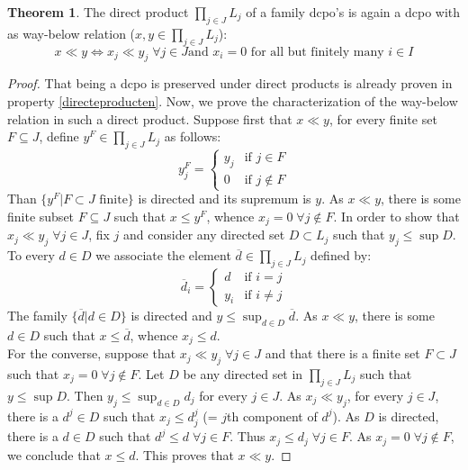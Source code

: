 \documentclass[a4paper,12pt]{article}
\theoremstyle{definition}
\newtheorem{theorem}{Theorem}[section]
\begin{document}
\begin{theorem}
The direct product $\prod_{j \in J}L_j$ of a family dcpo's is again a dcpo with as way-below relation ($x, y \in \prod_{j \in J}L_j$):
$$x \ll y \Leftrightarrow x_j \ll y_j \;\forall j \in J \text{and } x_i = 0 \text{ for all but finitely many } i \in I$$
\end{theorem}

\begin{proof}
That being a dcpo is preserved under direct products is already proven in property \ref{directeproducten}. Now, we prove the characterization of the way-below relation in such a direct product.  Suppose first that $x \ll y$, for every finite set $F \subseteq J$, define $y^F \in \prod_{j \in J}L_j$ as follows:
\begin{equation*}
  y_j^F=\begin{cases}
    y_j & \text{if $j \in F $}\\
    0 & \text{if $j \not\in F $}
  \end{cases}
\end{equation*}
Than $\{y^F | F \subset J \text{ finite}\}$ is directed and its supremum is $y$. As $x \ll y$, there is some finite subset $F \subseteq J$ such that $x \leq y^F$, whence $x_j = 0 \;\forall j \not\in F$.
In order to show that $x_j \ll y_j \;\forall j \in J$, fix $j$ and consider any directed set $D \subset L_j$ such that $y_j \leq \sup D$. To every $d \in D$ we associate the element $\overline{d} \in \prod_{j \in J}L_j$ defined by:
\begin{equation*}
  \overline{d}_i=\begin{cases}
    d & \text{if $i = j$}\\
    y_i & \text{if $i \neq j $}
  \end{cases}
\end{equation*}
The family $\{\overline{d}|d\in D\}$ is directed and $y \leq \sup_{d \in D}\overline{d}$. As $x \ll y$, there is some $d \in D$ such that $x \leq \overline{d}$, whence $x_j \leq d$.\\

For the converse, suppose that $x_j \ll y_j \;\forall j \in J$ and that there is a finite set $F \subset J$ such that $x_j = 0 \;\forall j \not\in F$. Let $D$ be any directed set in $\prod_{j \in J}L_j$ such that $y \leq \sup D$. Then $y_j \leq \sup_{d\in D}d_j$ for every $j \in J$. As $x_j \ll y_j$, for every $j \in J$, there is a $d^j \in D$ such that $x_j \leq d^j_j$ (= $j$th component of $d^j$). As $D$ is directed, there is a $d \in D$ such that $d^j \leq d \;\forall j \in F$. Thus $x_j \leq d_j \;\forall j \in F$. As $x_j = 0 \;\forall j \not\in F$, we conclude that $x \leq d$. This proves that $x \ll y$.

\end{proof}
\end{document}
